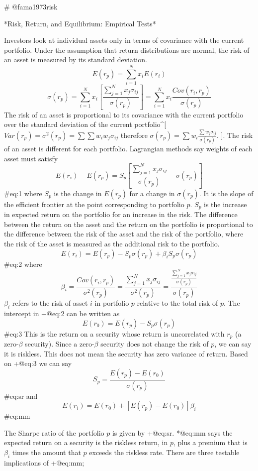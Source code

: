 
# @fama1973risk

*Risk, Return, and Equilibrium: Empirical Tests* 

Investors look at individual assets only in terms of covariance with the current portfolio.
Under the assumption that return distributions are normal, the risk of an asset is measured by its standard deviation.
$$
E(r_p) = \sum_{i=1}^N x_iE(r_i)
$$
$$
\sigma(r_p) = \sum_{i=1}^N x_i
\left[ \frac{\sum_{j=1}^N x_j \sigma_{ij}}{\sigma(r_p)} \right] =
\sum_{i=1}^N x_i \frac{Cov(r_i, r_p)}{\sigma(r_p)}
$$
The risk of an asset is proportional to its covariance with the current portfolio over the standard deviation of the current portfolio^[$Var(r_p)=\sigma^2(r_p)=\sum\sum w_iw_j\sigma_{ij}$ therefore $\sigma(r_p)=\sum w_i\frac{\sum w_j\sigma_{ij}}{\sigma(r_p)}$.
].
The risk of an asset is different for each portfolio.
Lagrangian methods say weights of each asset must satisfy
$$
E(r_i) - E(r_p) = S_p
\left[
\frac{\sum_{j=1}^Nx_j\sigma_{ij}}{\sigma(r_p)}-\sigma(r_p)
\right]
$$ {#eq:1}
where $S_p$ is the change in $E(r_p)$ for a change in $\sigma(r_p)$.
It is the slope of the efficient frontier at the point corresponding to portfolio $p$.
$S_p$ is the increase in expected return on the portfolio for an increase in the risk.
The difference between the return on the asset and the return on the portfolio is proportional to the difference between the risk of the asset and the risk of the portfolio, where the risk of the asset is measured as the additional risk to the portfolio.
$$
E(r_i) = E(r_p) - S_p\sigma(r_p) + \beta_iS_p\sigma(r_p)
$$ {#eq:2}
where
$$
\beta_i = \frac{Cov(r_i, r_p)}{\sigma^2(r_p)} =
    \frac{\sum_{j=1}^Nx_j\sigma_{ij}}{\sigma^2(r_p)} =
    \frac{\frac{\sum_{j=1}^Nx_j\sigma_{ij}}{\sigma(r_p)}}{\sigma(r_p)}
$$
$\beta_i$ refers to the risk of asset $i$ in portfolio $p$ relative to the total risk of $p$.
The intercept in +@eq:2 can be written as
$$
E(r_0) = E(r_p) - S_p\sigma(r_p)
$$ {#eq:3}
This is the return on a security whose return is uncorrelated with $r_p$ (a zero-$\beta$ security).
Since a zero-$\beta$ security does not change the risk of $p$, we can say it is riskless.
This does not mean the security has zero variance of return.
Based on +@eq:3 we can say
$$
S_p = \frac{E(r_p) - E(r_0)}{\sigma(r_p)}
$$ {#eq:sr}
and
$$
E(r_i) = E(r_0) + \left[E(r_p) - E(r_0)\right]\beta_i
$$ {#eq:mm}

The Sharpe ratio of the portfolio $p$ is given by +@eq:sr.
*@eq:mm says the expected return on a security is the riskless return, in $p$, plus a premium that is $\beta_i$ times the amount that $p$ exceeds the riskless rate.
There are three testable implications of +@eq:mm;

